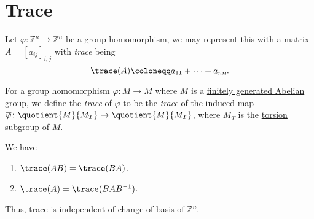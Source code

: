 \section{Trace}
\begin{definition}[Trace]\label{def:trace}
	Let \(\varphi \colon \mathbb{Z}^n \to \mathbb{Z}^n\) be a group homomorphism, we may represent this with a matrix
	\(A = \left[a_{ij}\right]_{i, j}\) with \emph{trace} being
	\[
		\trace(A) \coloneqq a_{11} + \dots + a_{nn}.
	\]

	For a group homomorphism \(\varphi \colon M \to M\) where \(M\) is a \hyperref[apx:ssc:finitely-generated-Abelian-group]{finitely generated Abelian group},
	we define the \emph{trace} of \(\varphi\) to be the \emph{trace} of the induced map \(\overline{\varphi} \colon \quotient{M}{M_T} \to \quotient{M}{M_T}\),
	where \(M_T\) is the \hyperref[def:torsion-subgroup]{torsion subgroup} of \(M\).
\end{definition}

\begin{exercise}
	We have
	\begin{enumerate}[(1)]
		\item \(\trace(AB) = \trace(BA)\).
		\item \(\trace(A) = \trace(BAB^{-1})\).
	\end{enumerate}

	Thus, \hyperref[def:trace]{trace} is independent of change of basis of \(\mathbb{Z} ^n\).
\end{exercise}